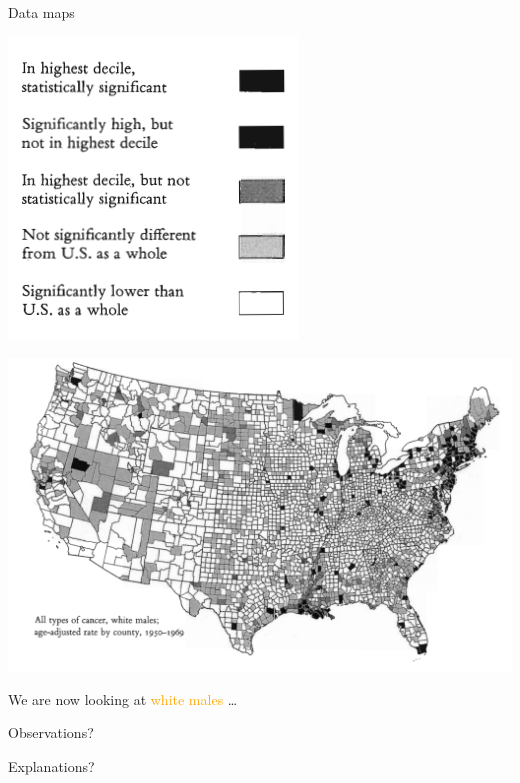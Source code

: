 \documentclass[
  ignorenonframetext,
]{beamer}
\begin{document}
\begin{frame}{Data maps}
\protect\hypertarget{data-maps-2}{}
\begin{minipage}{0.3\textwidth}
\centering
\includegraphics[width=\textwidth]{excellence_figs/fig_9.png}
\end{minipage}
\hfill
\begin{minipage}{0.6\textwidth}
\centering
\includegraphics[width=\textwidth]{excellence_figs/fig_10.png}
\end{minipage}

We are now looking at \textcolor{orange}{white males} \ldots{}

Observations?

Explanations?
\end{frame}
\end{document}
